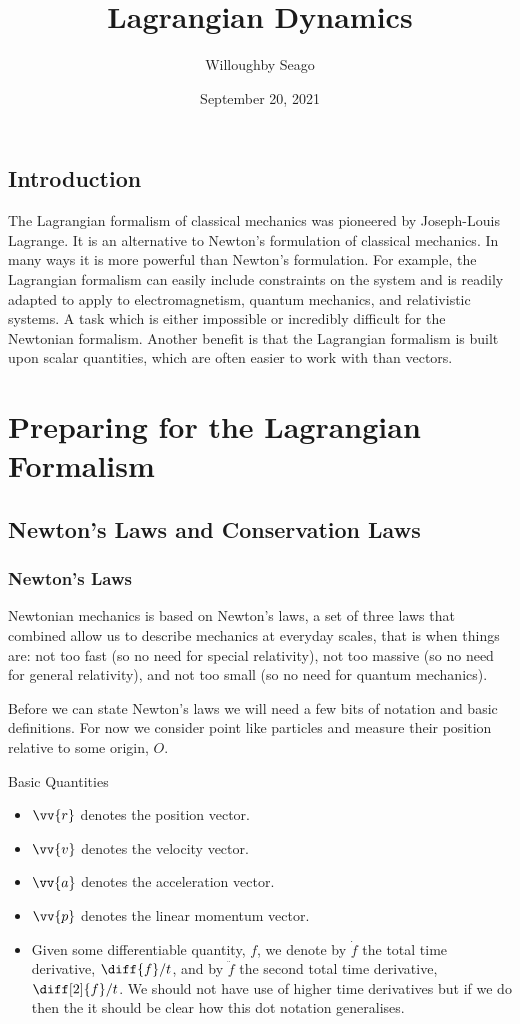 \documentclass[fleqn]{NotesClass}
\title{Lagrangian Dynamics}
\author{Willoughby Seago}
\date{September 20, 2021}
\begin{document}
    \frontmatter
    \titlepage
    \tableofcontents
    \listoffigures
    \mainmatter
    \chapter{Introduction}
    The Lagrangian formalism of classical mechanics was pioneered by Joseph-Louis Lagrange.
    It is an alternative to Newton's formulation of classical mechanics.
    In many ways it is more powerful than Newton's formulation.
    For example, the Lagrangian formalism can easily include constraints on the system and is readily adapted to apply to electromagnetism, quantum mechanics, and relativistic systems.
    A task which is either impossible or incredibly difficult for the Newtonian formalism.
    Another benefit is that the Lagrangian formalism is built upon scalar quantities, which are often easier to work with than vectors.
    
    \part{Preparing for the Lagrangian Formalism}
    \chapter{Newton's Laws and Conservation Laws}
    \section{Newton's Laws}
    Newtonian mechanics is based on Newton's laws, a set of three laws that combined allow us to describe mechanics at everyday scales, that is when things are: not too fast (so no need for special relativity), not too massive (so no need for general relativity), and not too small (so no need for quantum mechanics).
    
    Before we can state Newton's laws we will need a few bits of notation and basic definitions.
    For now we consider point like particles and measure their position relative to some origin, \(O\).
    \begin{ntn}{Basic Quantities}{}
        \begin{itemize}
            \item \(\vv{r}\) denotes the position vector.
            \item \(\vv{v}\) denotes the velocity vector.
            \item \(\vv{a}\) denotes the acceleration vector.
            \item \(\vv{p}\) denotes the linear momentum vector.
            \item Given some differentiable quantity, \(f\), we denote by \(\dot{f}\) the total time derivative, \(\diff{f}/{t}\), and by \(\ddot{f}\) the second total time derivative, \(\diff[2]{f}/{t}\).
            We should not have use of higher time derivatives but if we do then the it should be clear how this dot notation generalises.
        \end{itemize}
    \end{ntn}
    
\end{document}
